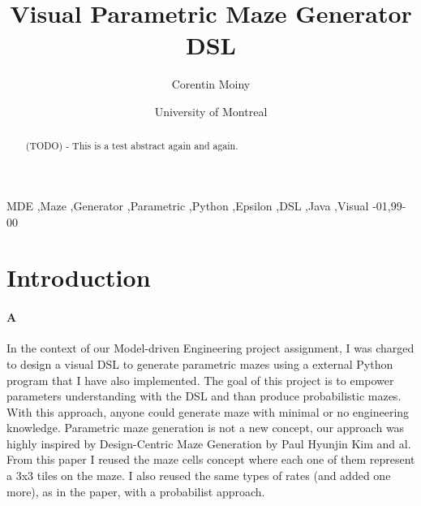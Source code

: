 \documentclass[review]{elsarticle}
\begin{document}
\begin{frontmatter}

\title{Visual Parametric Maze Generator DSL }

\author{Corentin Moiny}
\address{304, 5e Avenue Mailloux, La Pocatière. Quebec. Canada}

\author[mymainaddress]{University of Montreal}

\address[mymainaddress]{2900 Edouard Montpetit Blvd, Montreal, Quebec. Canada}

\begin{abstract}
(TODO) - This is a test abstract again and again.
\end{abstract}

\begin{keyword}
MDE \sep Maze \sep Generator \sep Parametric \sep Python \sep Epsilon \sep DSL \sep Java \sep Visual
-01\sep  99-00
\end{keyword}

\end{frontmatter}

\linenumbers

\section{Introduction}

\paragraph{A}
In the context of our Model-driven Engineering project assignment, I was charged to design a visual DSL to generate parametric mazes using a external Python program that I have also implemented. The goal of this project is to empower parameters understanding with the DSL and than produce probabilistic mazes. With this approach, anyone could generate maze with minimal or no engineering knowledge. Parametric maze generation is not a new concept, our approach was highly inspired by Design-Centric Maze Generation by Paul Hyunjin Kim and al\cite{kim_design-centric_2019}. From this paper I reused the maze cells concept where each one of them represent a 3x3 tiles on the maze. I also reused the same types of rates (and added one more), as in the paper, with a probabilist approach.
\end{document}
